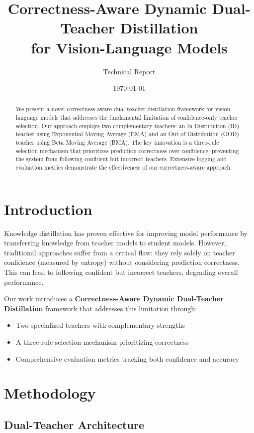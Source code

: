 \documentclass[11pt,a4paper]{article}
\title{\textbf{Correctness-Aware Dynamic Dual-Teacher Distillation\\for Vision-Language Models}}
\author{Technical Report}
\date{\today}
\begin{document}
\maketitle

\begin{abstract}
We present a novel correctness-aware dual-teacher distillation framework for vision-language models that addresses the fundamental limitation of confidence-only teacher selection. Our approach employs two complementary teachers: an In-Distribution (ID) teacher using Exponential Moving Average (EMA) and an Out-of-Distribution (OOD) teacher using Beta Moving Average (BMA). The key innovation is a three-rule selection mechanism that prioritizes prediction correctness over confidence, preventing the system from following confident but incorrect teachers. Extensive logging and evaluation metrics demonstrate the effectiveness of our correctness-aware approach.
\end{abstract}

\section{Introduction}

Knowledge distillation has proven effective for improving model performance by transferring knowledge from teacher models to student models. However, traditional approaches suffer from a critical flaw: they rely solely on teacher confidence (measured by entropy) without considering prediction correctness. This can lead to following confident but incorrect teachers, degrading overall performance.

Our work introduces a \textbf{Correctness-Aware Dynamic Dual-Teacher Distillation} framework that addresses this limitation through:
\begin{itemize}
\item Two specialized teachers with complementary strengths
\item A three-rule selection mechanism prioritizing correctness
\item Comprehensive evaluation metrics tracking both confidence and accuracy
\end{itemize}

\section{Methodology}

\subsection{Dual-Teacher Architecture}
\end{document}

